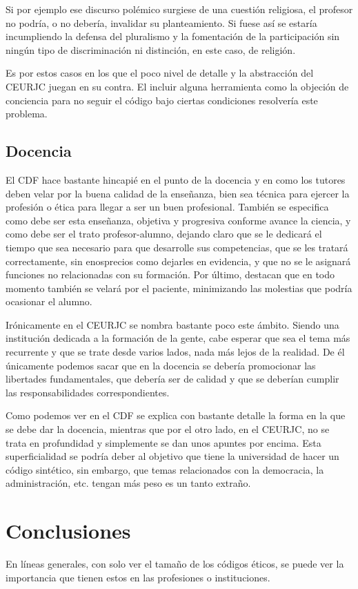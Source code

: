 \documentclass[11pt,a4paper]{article}
\begin{document}
Si por ejemplo ese discurso polémico surgiese de una cuestión religiosa, el profesor no podría, o no debería, invalidar su planteamiento. Si fuese así se estaría incumpliendo la defensa del pluralismo y la fomentación de la participación sin ningún tipo de discriminación ni distinción, en este caso, de religión.

Es por estos casos en los que el poco nivel de detalle y la abstracción del CEURJC juegan en su contra. El incluir alguna herramienta como la objeción de conciencia para no seguir el código bajo ciertas condiciones resolvería este problema.


\subsection{Docencia}
El CDF hace bastante hincapié en el punto de la docencia y en como los tutores deben velar por la buena calidad de la enseñanza, bien sea técnica para ejercer la profesión o ética para llegar a ser un buen profesional. También se especifica como debe ser esta enseñanza, objetiva y progresiva conforme avance la ciencia, y como debe ser el trato profesor-alumno, dejando claro que se le dedicará el tiempo que sea necesario para que desarrolle sus competencias, que se les tratará correctamente, sin enosprecios como dejarles en evidencia, y que no se le asignará funciones no relacionadas con su formación. Por último, destacan que en todo momento también se velará por el paciente, minimizando las molestias que podría ocasionar el alumno. 

Irónicamente en el CEURJC se nombra bastante poco este ámbito. Siendo una institución dedicada a la formación de la gente, cabe esperar que sea el tema más recurrente y que se trate desde varios lados, nada más lejos de la realidad. De él únicamente podemos sacar que en la docencia se debería promocionar las libertades fundamentales, que debería ser de calidad y que se deberían cumplir las responsabilidades correspondientes.

Como podemos ver en el CDF se explica con bastante detalle la forma en la que se debe dar la docencia, mientras que por el otro lado, en el CEURJC, no se trata en profundidad y simplemente se dan unos apuntes por encima. Esta superficialidad se podría deber al objetivo que tiene la universidad de hacer un código sintético, sin embargo, que temas relacionados con la democracia, la administración, etc. tengan más peso es un tanto extraño.



\section{Conclusiones}
En líneas generales, con solo ver el tamaño de los códigos éticos, se puede ver la importancia que tienen estos en las profesiones o instituciones.
\end{document}
